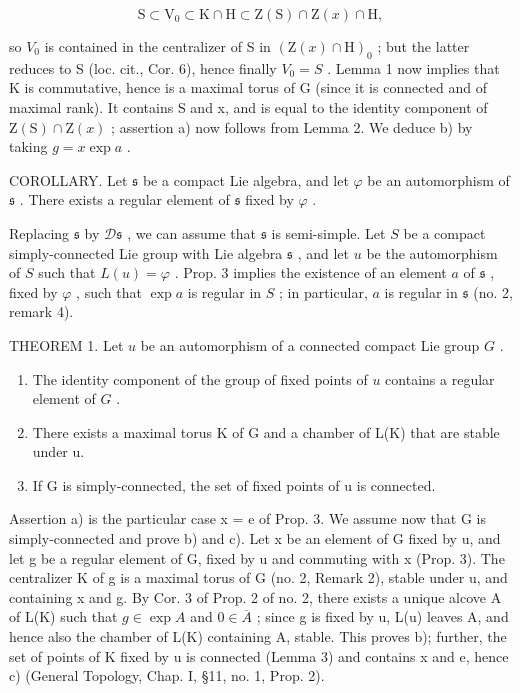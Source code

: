 \[
\mathrm{S} \subset \mathrm{V} _ {0} \subset \mathrm{K} \cap \mathrm{H} \subset \mathrm{Z} (\mathrm{S}) \cap \mathrm{Z} (x) \cap \mathrm{H},
\]

so \(V_{0}\) is contained in the centralizer of S in \((\mathrm{Z}(x)\cap\mathrm{H})_{0}\) ; but the latter reduces to S (loc. cit., Cor. 6), hence finally \(V_{0}=S\) . Lemma 1 now implies that K is commutative, hence is a maximal torus of G (since it is connected and of maximal rank). It contains S and x, and is equal to the identity component of \(\mathrm{Z}(\mathrm{S})\cap\mathrm{Z}(x)\) ; assertion a) now follows from Lemma 2. We deduce b) by taking \(g=x\exp a\) .

COROLLARY. Let \(\mathfrak{s}\) be a compact Lie algebra, and let \(\varphi\) be an automorphism of \(\mathfrak{s}\) . There exists a regular element of \(\mathfrak{s}\) fixed by \(\varphi\) .

Replacing \(\mathfrak{s}\) by \(\mathcal{D}\mathfrak{s}\) , we can assume that \(\mathfrak{s}\) is semi-simple. Let \(S\) be a compact simply-connected Lie group with Lie algebra \(\mathfrak{s}\) , and let \(u\) be the automorphism of \(S\) such that \(L(u) = \varphi\) . Prop. 3 implies the existence of an element \(a\) of \(\mathfrak{s}\) , fixed by \(\varphi\) , such that \(\exp a\) is regular in \(S\) ; in particular, \(a\) is regular in \(\mathfrak{s}\) (no. 2, remark 4).

THEOREM 1. Let \(u\) be an automorphism of a connected compact Lie group \(G\) .

\begin{enumerate}
\def\labelenumi{\alph{enumi})}
\item
  The identity component of the group of fixed points of \(u\) contains a regular element of \(G\) .
\item
  There exists a maximal torus K of G and a chamber of L(K) that are stable under u.
\item
  If G is simply-connected, the set of fixed points of u is connected.
\end{enumerate}

Assertion a) is the particular case x = e of Prop. 3. We assume now that G is simply-connected and prove b) and c). Let x be an element of G fixed by u, and let g be a regular element of G, fixed by u and commuting with x (Prop. 3). The centralizer K of g is a maximal torus of G (no. 2, Remark 2), stable under u, and containing x and g. By Cor. 3 of Prop. 2 of no. 2, there exists a unique alcove A of L(K) such that \(g \in \exp A\) and \(0 \in \overline{A}\) ; since g is fixed by u, L(u) leaves A, and hence also the chamber of L(K) containing A, stable. This proves b); further, the set of points of K fixed by u is connected (Lemma 3) and contains x and e, hence c) (General Topology, Chap. I, §11, no. 1, Prop. 2).

